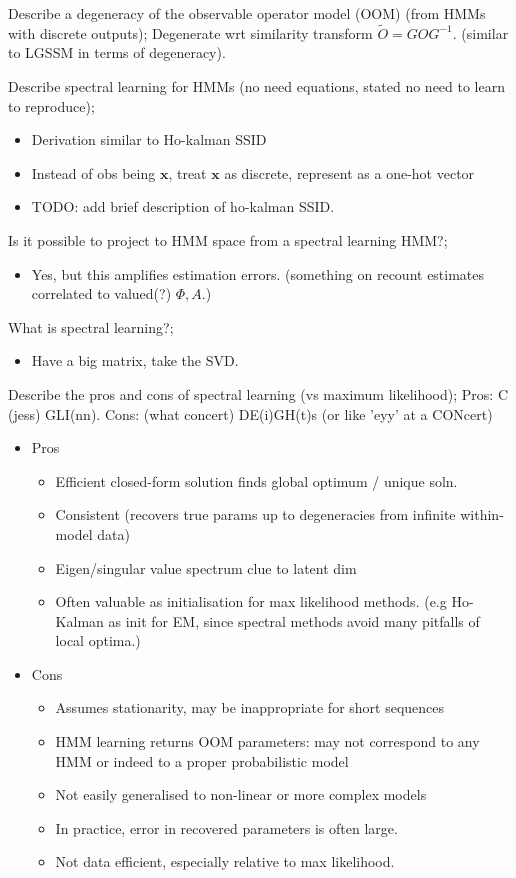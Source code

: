 \documentclass{article}
\begin{document}
Describe a degeneracy of the observable operator model (OOM) (from HMMs with discrete outputs); Degenerate wrt similarity transform $\tilde{O}=GOG^{-1}$. (similar to LGSSM in terms of degeneracy).

Describe spectral learning for HMMs (no need equations, stated no need to learn to reproduce); \begin{itemize} \item Derivation similar to Ho-kalman SSID \item Instead of obs being $\mathbf{x}$, treat $\mathbf{x}$ as discrete, represent as a one-hot vector \item TODO: add brief description of ho-kalman SSID. \end{itemize}

Is it possible to project to HMM space from a spectral learning HMM?; \begin{itemize} \item Yes, but this amplifies estimation errors. (something on recount estimates correlated to valued(?) $\Phi, A$.) \end{itemize} 

What is spectral learning?; \begin{itemize} \item Have a big matrix, take the SVD. \end{itemize}

Describe the pros and cons of spectral learning (vs maximum likelihood); Pros: C (jess) GLI(nn). Cons: (what concert) DE(i)GH(t)s (or like 'eyy' at a CONcert)\begin{itemize} \item Pros \begin{itemize} \item Efficient closed-form solution finds global optimum / unique soln. \item Consistent (recovers true params up to degeneracies from infinite within-model data) \item Eigen/singular value spectrum clue to latent dim \item Often valuable as initialisation for max likelihood methods. (e.g Ho-Kalman as init for EM, since spectral methods avoid many pitfalls of local optima.) \end{itemize} \item Cons \begin{itemize} \item Assumes stationarity, may be inappropriate for short sequences \item HMM learning returns OOM parameters: may not correspond to any HMM or indeed to a proper probabilistic model \item Not easily generalised to non-linear or more complex models \item In practice, error in recovered parameters is often large.  \item Not data efficient, especially relative to max likelihood. \end{itemize} \end{itemize}
\end{document}
